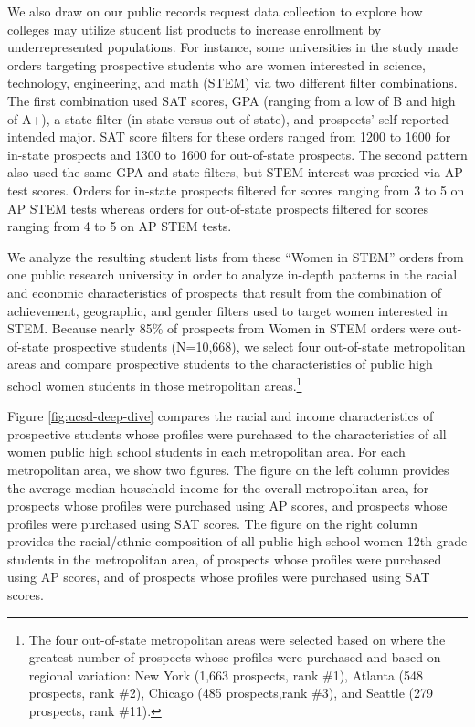 \documentclass[
  12pt,
]{article}
\begin{document}
We also draw on our public records request data collection to explore how colleges may utilize student list products to increase enrollment by underrepresented populations. For instance, some universities in the study made orders targeting prospective students who are women interested in science, technology, engineering, and math (STEM) via two different filter combinations. The first combination used SAT scores, GPA (ranging from a low of B and high of A+), a state filter (in-state versus out-of-state), and prospects' self-reported intended major. SAT score filters for these orders ranged from 1200 to 1600 for in-state prospects and 1300 to 1600 for out-of-state prospects. The second pattern also used the same GPA and state filters, but STEM interest was proxied via AP test scores. Orders for in-state prospects filtered for scores ranging from 3 to 5 on AP STEM tests whereas orders for out-of-state prospects filtered for scores ranging from 4 to 5 on AP STEM tests.

We analyze the resulting student lists from these ``Women in STEM'' orders from one public research university in order to analyze in-depth patterns in the racial and economic characteristics of prospects that result from the combination of achievement, geographic, and gender filters used to target women interested in STEM. Because nearly 85\% of prospects from Women in STEM orders were out-of-state prospective students (N=10,668), we select four out-of-state metropolitan areas and compare prospective students to the characteristics of public high school women students in those metropolitan areas.\footnote{The four out-of-state metropolitan areas were selected based on where the greatest number of prospects whose profiles were purchased and based on regional variation: New York (1,663 prospects, rank \#1), Atlanta (548 prospects, rank \#2), Chicago (485 prospects,rank \#3), and Seattle (279 prospects, rank \#11).}

Figure \ref{fig:ucsd-deep-dive} compares the racial and income characteristics of prospective students whose profiles were purchased to the characteristics of all women public high school students in each metropolitan area. For each metropolitan area, we show two figures. The figure on the left column provides the average median household income for the overall metropolitan area, for prospects whose profiles were purchased using AP scores, and prospects whose profiles were purchased using SAT scores. The figure on the right column provides the racial/ethnic composition of all public high school women 12th-grade students in the metropolitan area, of prospects whose profiles were purchased using AP scores, and of prospects whose profiles were purchased using SAT scores.
\end{document}
